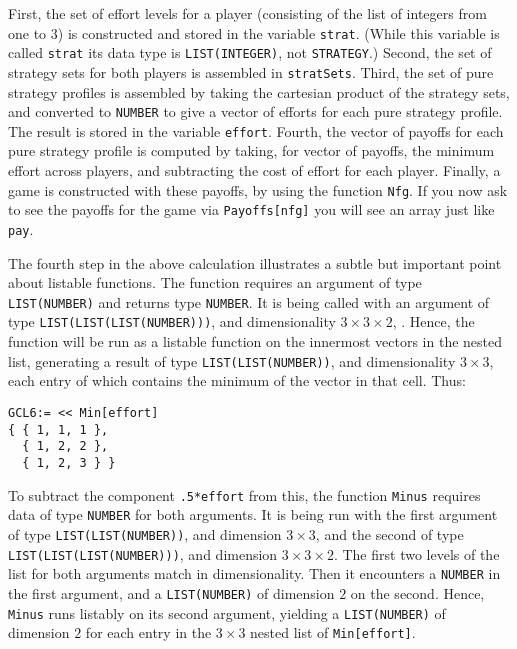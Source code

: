 First, the set of effort levels for a player (consisting of the list
of integers from one to 3) is constructed and stored in the variable
\verb+strat+.  (While this variable is called \verb+strat+ its data
type is \verb+LIST(INTEGER)+, not \verb+STRATEGY+.)  Second, the set
of strategy sets for both players is assembled in \verb+stratSets+.
Third, the set of pure strategy profiles is assembled by taking the
cartesian product of the strategy sets, and converted to \verb+NUMBER+
to give a vector of efforts for each pure strategy profile.  The
result is stored in the variable \verb+effort+.  Fourth, the vector of
payoffs for each pure strategy profile is computed by taking, for
vector of payoffs, the minimum effort across players, and subtracting
the cost of effort for each player.  Finally, a game is constructed
with these payoffs, by using the function \verb+Nfg+.  If you now ask
to see the payoffs for the game via \verb+Payoffs[nfg]+ you will see
an array just like \verb+pay+.

The fourth step in the above calculation illustrates a subtle but
important point about listable functions.  The function 
requires an argument of type \verb+LIST(NUMBER)+ and returns type
\verb+NUMBER+.  It is being called with an argument of type
\verb+LIST(LIST(LIST(NUMBER)))+, and dimensionality $3\times 3\times
2$, .  Hence, the function will be run as a listable function on the
innermost vectors in the nested list, generating a result of type
\verb+LIST(LIST(NUMBER))+, and dimensionality $3\times 3$, each entry
of which contains the minimum of the vector in that cell.  Thus:

\begin{verbatim}
GCL6:= << Min[effort]
{ { 1, 1, 1 },
  { 1, 2, 2 },
  { 1, 2, 3 } }
\end{verbatim}

\noindent
To subtract the component \verb+.5*effort+ from this, the function
\verb+Minus+ requires data of type \verb+NUMBER+ for both arguments.
It is being run with the first argument of type
\verb+LIST(LIST(NUMBER))+, and dimension $3\times 3$, and the second of
type \verb+LIST(LIST(LIST(NUMBER)))+, and dimension $3\times 3\times
2$.  The first two levels of the list for both arguments match
in dimensionality.  Then it encounters a \verb+NUMBER+ in the first
argument, and a \verb+LIST(NUMBER)+ of dimension $2$ on the second.
Hence, \verb+Minus+ runs listably on its second argument, yielding a
\verb+LIST(NUMBER)+ of dimension $2$ for each entry in the $3\times 3$
nested list of \verb+Min[effort]+. 

